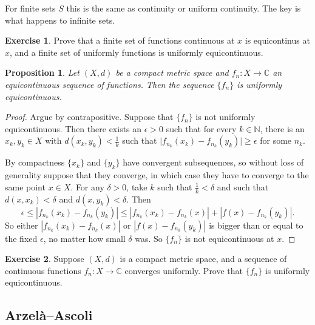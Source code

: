 \documentclass[12pt,openany]{book}
\newcommand{\sabs}[1]{\lvert {#1} \rvert}
\newcommand{\abs}[1]{\left\lvert {#1} \right\rvert}
\newcommand{\C}{{\mathbb{C}}}
\newcommand{\N}{{\mathbb{N}}}
\theoremstyle{plain}
\newtheorem{prop}[thm]{Proposition}
\theoremstyle{remark}
\theoremstyle{definition}
\newenvironment{exbox}{%
    \def\FrameCommand{\vrule width 1pt \relax\hspace {10pt}}%
    \MakeFramed {\advance \hsize -\width \FrameRestore }%
}{%
    \endMakeFramed
}
\theoremstyle{exercise}
\newtheorem{exercise}{Exercise}[section]
\theoremstyle{example}
\begin{document}
For finite sets $S$ this is the same as continuity or uniform continuity.  The
key is what happens to infinite sets.

\begin{exbox}
\begin{exercise}
Prove that a finite set of functions continuous at $x$ is
equicontinus at $x$, and
a finite set of uniformly functions is uniformly equicontinuous.
\end{exercise}
\end{exbox}

\begin{prop}
Let $(X,d)$ be a compact metric space and
$f_n \colon X \to \C$ an equicontinuous sequence of functions.
Then the sequence $\{ f_n \}$ is uniformly equicontinuous.
\end{prop}

\begin{proof}
Argue by contrapositive.  Suppose that $\{ f_n \}$ is not
uniformly equicontinuous.  Then there exists an $\epsilon > 0$
such that for every $k \in \N$, there
is an $x_k,y_k \in X$ with $d(x_k,y_k) < \frac{1}{k}$
such that $\sabs{f_{n_k}(x_k)-f_{n_k}(y_k)} \geq \epsilon$ for some $n_k$.

By compactness $\{x_k\}$ and $\{ y_k\}$ have convergent subsequences, so
without loss of generality suppose that they converge, in which case
they have to converge to the same point $x \in X$.
For any $\delta > 0$, take $k$ such that $\frac{1}{k} < \delta$ and
such that $d(x,x_k) < \delta$ and
$d(x,y_k) < \delta$.  Then
\begin{equation*}
\epsilon \leq 
\abs{f_{n_k}(x_k)-f_{n_k}(y_k)}
\leq
\abs{f_{n_k}(x_k)-f_{n_k}(x)} + \abs{f(x)-f_{n_k}(y_k)} .
\end{equation*}
So either 
$\abs{f_{n_k}(x_k)-f_{n_k}(x)}$ or $\abs{f(x)-f_{n_k}(y_k)}$ is
bigger than or equal to the fixed $\epsilon$, no matter how small $\delta$
was.  So $\{ f_n \}$ is not equicontinuous at $x$.
\end{proof}

\begin{exbox}
\begin{exercise}
Suppose $(X,d)$ is a compact metric space,
and a sequence of continuous functions $f_n \colon X \to \C$
converges uniformly. Prove that $\{ f_n \}$ is uniformly equicontinuous.
\end{exercise}
\end{exbox}

\subsection{Arzel\`a--Ascoli}
\end{document}
